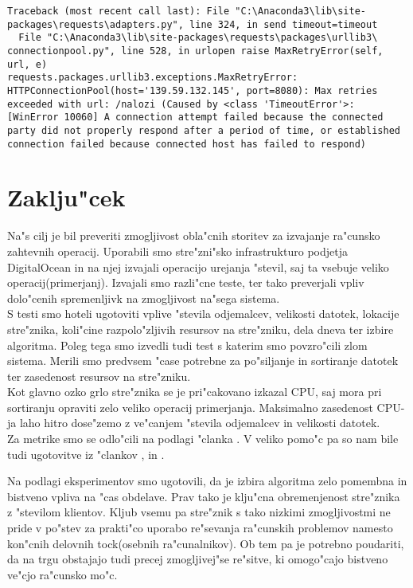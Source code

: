 \begin{itemize}
	\begin{lstlisting}
Traceback (most recent call last): File "C:\Anaconda3\lib\site-packages\requests\adapters.py", line 324, in send timeout=timeout
  File "C:\Anaconda3\lib\site-packages\requests\packages\urllib3\ connectionpool.py", line 528, in urlopen raise MaxRetryError(self, url, e)
requests.packages.urllib3.exceptions.MaxRetryError: HTTPConnectionPool(host='139.59.132.145', port=8080): Max retries exceeded with url: /nalozi (Caused by <class 'TimeoutError'>: [WinError 10060] A connection attempt failed because the connected party did not properly respond after a period of time, or established connection failed because connected host has failed to respond)
	\end{lstlisting}

    \end{itemize}


\section{Zaklju"cek}

Na"s cilj je bil preveriti zmogljivost obla"cnih storitev za izvajanje ra"cunsko zahtevnih operacij. Uporabili smo stre"zni"sko infrastrukturo podjetja DigitalOcean in na njej izvajali operacijo urejanja "stevil, saj ta vsebuje veliko operacij(primerjanj).
Izvajali smo razli"cne teste, ter tako preverjali vpliv dolo"cenih spremenljivk na zmogljivost na"sega sistema. \\
S testi smo hoteli ugotoviti vplive "stevila odjemalcev, velikosti datotek, lokacije stre"znika, koli"cine razpolo"zljivih resursov na stre"zniku, dela dneva ter izbire algoritma. Poleg tega smo izvedli tudi test s katerim smo povzro"cili zlom sistema.
Merili smo predvsem "case potrebne za po"siljanje in sortiranje datotek ter zasedenost resursov na stre"zniku.\\
Kot glavno ozko grlo stre"znika se je pri"cakovano izkazal CPU, saj mora pri sortiranju opraviti zelo veliko operacij primerjanja. Maksimalno zasedenost CPU-ja laho hitro dose"zemo z ve"canjem "stevila odjemalcev in velikosti datotek.\\
Za metrike smo se odlo"cili na podlagi "clanka \cite{8_ibm_metrics}. V veliko pomo"c pa so nam bile tudi ugotovitve iz "clankov \cite{8_performance_challenges}, \cite{8_performance_analysis} in \cite{8_performance_evaluation}.

Na podlagi eksperimentov smo ugotovili, da je izbira algoritma zelo pomembna in bistveno vpliva na "cas obdelave. Prav tako je klju"cna obremenjenost stre"znika z "stevilom klientov.
Kljub vsemu pa stre"znik s tako nizkimi zmogljivostmi ne pride v po"stev za prakti"co uporabo re"sevanja ra"cunskih problemov namesto kon"cnih delovnih tock(osebnih ra"cunalnikov). Ob tem pa je potrebno poudariti, da na trgu obstajajo tudi precej
zmogljivej"se re"sitve, ki omogo"cajo bistveno ve"cjo ra"cunsko mo"c.
